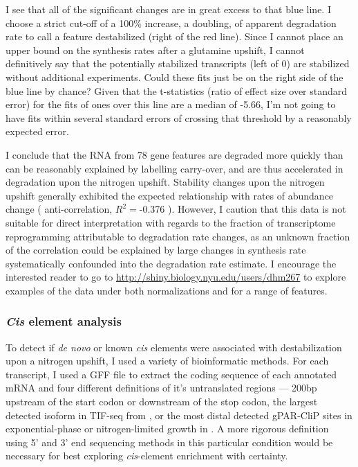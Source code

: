 I see that all of the significant changes are in great excess to that
blue line. I choose a strict cut-off of a 100\%
increase, a doubling, of apparent degradation rate to call a feature
destabilized (right of the red line). Since I cannot place an upper
bound on the synthesis rates after a glutamine upshift, I cannot
definitively say that the potentially stabilized transcripts (left of 0)
are stabilized without additional experiments.
Could these fits just be on the right side of the blue line by chance?
Given that the t-statistics (ratio of effect size over standard error)
for the fits of ones over this line are a median of -5.66,
I'm not going to have fits within several standard errors of
crossing that threshold by a reasonably expected error.

I conclude that the RNA from 78 gene features are degraded 
more quickly than can be reasonably
explained by labelling carry-over, and are thus accelerated in
degradation upon the nitrogen upshift.
Stability changes upon the nitrogen upshift generally exhibited the  
expected relationship with rates of abundance change (               
anti-correlation, $R^2=$-0.376 ).
However, I caution that this data is not suitable for direct
interpretation with regards to the fraction of transcriptome
reprogramming attributable to degradation rate changes, 
as an unknown fraction of the correlation could be explained
by large changes in synthesis rate systematically confounded into
the degradation rate estimate.
I encourage the interested reader to go to
\url{http://shiny.biology.nyu.edu/users/dhm267} to explore examples of
the data under both normalizations and for a range of features.

\subsubsection{\textit{Cis} element analysis}

To detect if \textit{de novo} or known \textit{cis} elements were 
associated with destabilization upon a nitrogen upshift,
I used a variety of bioinformatic methods.  
For each transcript, I used a GFF file to extract the coding sequence
of each annotated mRNA and four different definitions of it's
untranslated regions --- 
200bp upstream of the start codon or downstream
of the stop codon, the largest detected isoform in TIF-seq from
\parencite{pelechano2014genome}, 
or the most distal detected gPAR-CliP sites in
exponential-phase or nitrogen-limited growth in 
\parencite{freeberg2013pervasive}.
A more rigorous definition using 5' and 3' end sequencing methods 
in this particular condition would be necessary for best exploring 
\textit{cis}-element enrichment with certainty. 

